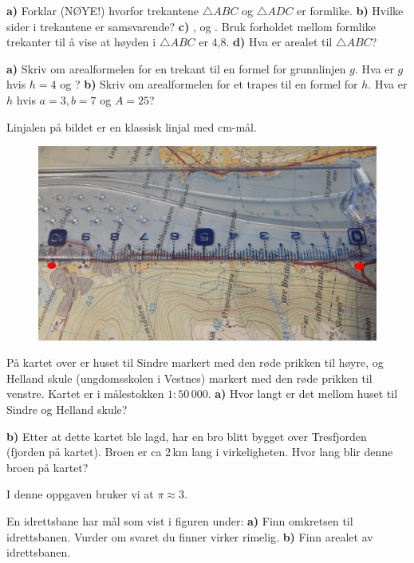 \vs \vs
{}
\textbf{a)} Forklar (NØYE!) hvorfor trekantene $ \triangle ABC $ og $ \triangle ADC $ er formlike. \os
\textbf{b)} Hvilke sider i trekantene er samsvarende?\os
\textbf{c)} ,  og . Bruk forholdet mellom formlike trekanter til å vise at høyden i $ \triangle ABC $ er 4,8.\os
\textbf{d)} Hva er arealet til $ \triangle ABC $?\os


\textbf{a)} Skriv om arealformelen for en trekant til en formel for grunnlinjen $ g $. Hva er $ g $ hvis $ {h=4} $ og ?\os
\textbf{b)} Skriv om arealformelen for et trapes til en formel for $ h $. Hva er $ h $ hvis $ {a=3, b=7} $ og $ {A=25} $?

Linjalen på bildet er en klassisk linjal med cm-mål.
\begin{figure}
	\centering
	\includegraphics[scale=0.06]{kart}
\end{figure}
På kartet over er huset til Sindre markert med den røde prikken til høyre, og Helland skule (ungdomsskolen i Vestnes) markert med den røde prikken til venstre. Kartet er i målestokken $ {1:50\,000} $.\os
\textbf{a)} Hvor langt er det mellom huset til Sindre og Helland skule?\os

\textbf{b)} Etter at dette kartet ble lagd, har en bro blitt bygget over Tresfjorden (fjorden på kartet). Broen er ca 2\,km lang i virkeligheten. Hvor lang blir denne broen på kartet?

I denne oppgaven bruker vi at $ \pi\approx 3 $.\os

En idrettsbane har mål som vist i figuren under:
\textbf{a)} Finn omkretsen til idrettsbanen. Vurder om svaret du finner virker rimelig.\os
\textbf{b)} Finn arealet av idrettsbanen.\vsk

\footnotesize
{}


